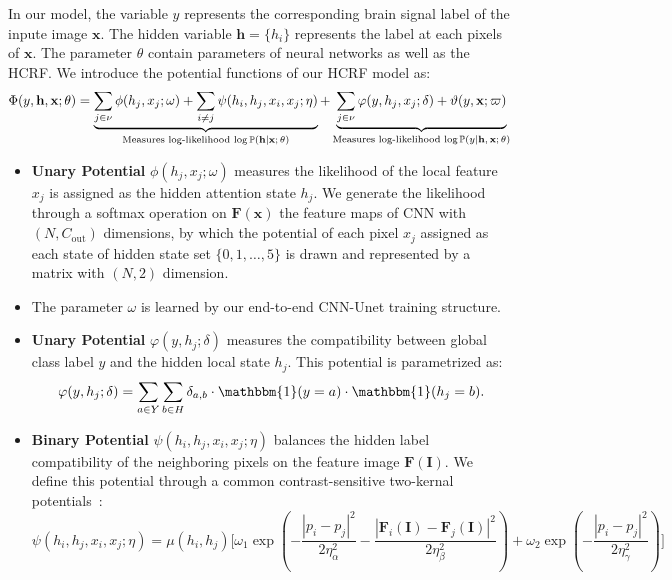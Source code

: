 \documentclass[10pt]{article}
\newcommand{\PP}{{\mathbb{P}}}
\newcommand{\Fb}{\mathbf{F}}
\newcommand{\Ib}{\mathbf{I}}
\newcommand{\hb}{\mathbf{h}}
\newcommand{\xb}{\mathbf{x}}
\newcommand{\one}{\mathbbm{1}}
\begin{document}
In our model, the variable $y$ represents the corresponding brain signal
label of the inpute image $\xb$. The hidden variable $\hb= \{h_i\}$
represents the label at each pixels of $\xb$. The parameter $\theta$
contain parameters of neural networks as well as the HCRF.
We introduce the potential functions of our HCRF model as:
\begin{equation*}
\Phi(y, \hb, \xb; \theta) = \underbrace{
\sum_{j \in \nu} \phi(h_j, x_j; \omega) +
\sum_{i \neq j} \psi(h_i, h_j, x_i, x_j; \eta)}_{
\textrm{Measures log-likelihood $\log\PP(\hb \vert \xb; \theta)$}}
+ \underbrace{
\sum_{j \in \nu} \varphi(y, h_j, x_j; \delta) + \vartheta(y, \xb; \varpi)
}_{
\textrm{Measures log-likelihood $\log\PP(y \vert \hb, \xb; \theta)$}
}
\end{equation*}


\begin{itemize}
\item \textbf{Unary Potential}
$\phi(h_j, x_j; \omega)$ measures the likelihood of the local feature
$x_j$ is assigned as the hidden attention state $h_j$.
We generate the likelihood through a softmax operation on $\Fb(\xb)$
the feature maps of CNN with $(N, C_{\textrm{out}})$ dimensions,
by which the potential of each pixel $x_j$ assigned as each state of
hidden state set $\{0, 1, \dots, 5\}$ is drawn and represented by
a matrix with $(N, 2)$ dimension.
\item The parameter $\omega$ is learned by our end-to-end CNN-Unet
training structure.
\item \textbf{Unary Potential}
$\varphi(y, h_j; \delta)$ measures the compatibility between global class
label $y$ and the hidden local state $h_j$. This potential is parametrized as:
\begin{align*}
\varphi(y, h_{j}; \delta) = \sum_{a \in Y} \sum_{b \in H} \delta_{a, b}
\cdot \one(y = a) \cdot \one(h_j = b).
\end{align*}
\item \textbf{Binary Potential}
$\psi(h_i, h_j, x_i, x_j; \eta)$ balances the hidden label compatibility
of the neighboring pixels on the feature image $\Fb(\Ib)$.
We define this potential through a common contrast-sensitive two-kernal 
potentials~\citep{krahenbuhl2011efficient,chen2022end}:
\begin{equation*}
\psi(h_i, h_j, x_i, x_j; \eta) = \mu(h_i, h_j) \Bigg[
\omega_1 \exp \left(
-\frac{\left\lvert p_i - p_j \right\rvert^2}{2\eta_\alpha^2}
-\frac{\left\lvert \Fb_i(\Ib) - \Fb_j(\Ib) \right\rvert^2}{2\eta_\beta^2} 
\right) + \omega_2 \exp \left(
- \frac{\left\lvert p_i - p_j \right\rvert^2}{2 \eta_\gamma^2}
\right)
\Bigg]
\end{equation*}
\end{itemize}
\end{document}
